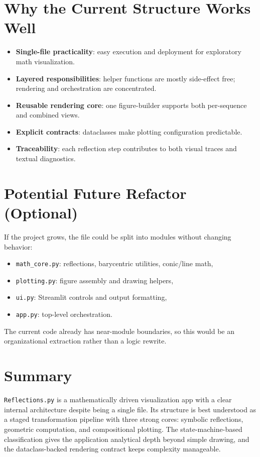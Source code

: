 \documentclass[11pt,a4paper]{article}
\begin{document}
\section*{Why the Current Structure Works Well}
\begin{itemize}
    \item \textbf{Single-file practicality}: easy execution and deployment for exploratory math visualization.
    \item \textbf{Layered responsibilities}: helper functions are mostly side-effect free; rendering and orchestration are concentrated.
    \item \textbf{Reusable rendering core}: one figure-builder supports both per-sequence and combined views.
    \item \textbf{Explicit contracts}: dataclasses make plotting configuration predictable.
    \item \textbf{Traceability}: each reflection step contributes to both visual traces and textual diagnostics.
\end{itemize}

\section*{Potential Future Refactor (Optional)}
If the project grows, the file could be split into modules without changing behavior:

\begin{itemize}
    \item \texttt{math\_core.py}: reflections, barycentric utilities, conic/line math,
    \item \texttt{plotting.py}: figure assembly and drawing helpers,
    \item \texttt{ui.py}: Streamlit controls and output formatting,
    \item \texttt{app.py}: top-level orchestration.
\end{itemize}

The current code already has near-module boundaries, so this would be an organizational extraction rather than a logic rewrite.

\section*{Summary}
\texttt{Reflections.py} is a mathematically driven visualization app with a clear internal architecture despite being a single file. Its structure is best understood as a staged transformation pipeline with three strong cores: symbolic reflections, geometric computation, and compositional plotting. The state-machine-based classification gives the application analytical depth beyond simple drawing, and the dataclass-backed rendering contract keeps complexity manageable.
\end{document}
